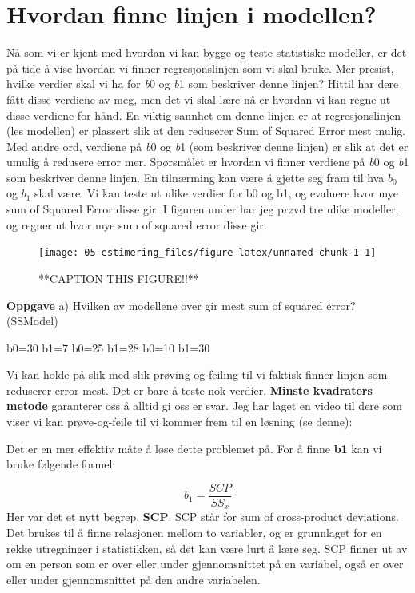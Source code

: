 \documentclass[
]{book}
\begin{document}
\hypertarget{hvordan-finne-linjen-i-modellen}{%
\chapter{Hvordan finne linjen i modellen?}\label{hvordan-finne-linjen-i-modellen}}

Nå som vi er kjent med hvordan vi kan bygge og teste statistiske modeller, er det på tide å vise hvordan vi finner regresjonslinjen som vi skal bruke. Mer presist, hvilke verdier skal vi ha for \emph{b}0 og \emph{b}1 som beskriver denne linjen? Hittil har dere fått disse verdiene av meg, men det vi skal lære nå er hvordan vi kan regne ut disse verdiene for hånd. En viktig sannhet om denne linjen er at regresjonslinjen (les modellen) er plassert slik at den reduserer Sum of Squared Error mest mulig. Med andre ord, verdiene på \emph{b}0 og \emph{b}1 (som beskriver denne linjen) er slik at det er umulig å redusere error mer. Spørsmålet er hvordan vi finner verdiene på \emph{b}0 og \emph{b}1 som beskriver denne linjen. En tilnærming kan være å gjette seg fram til hva \(b_0\) og \(b_1\) skal være. Vi kan teste ut ulike verdier for b0 og b1, og evaluere hvor mye sum of Squared Error disse gir. I figuren under har jeg prøvd tre ulike modeller, og regner ut hvor mye sum of squared error disse gir.

\begin{figure}

{\centering \texttt{[image: 05-estimering\_files/figure-latex/unnamed-chunk-1-1]} 

}

\caption{**CAPTION THIS FIGURE!!**}\label{fig:unnamed-chunk-1}
\end{figure}

\textbf{Oppgave}
a) Hvilken av modellene over gir mest sum of squared error? (SSModel)

b0=30 b1=7 b0=25 b1=28 b0=10 b1=30

Vi kan holde på slik med slik prøving-og-feiling til vi faktisk finner linjen som reduserer error mest. Det er bare å teste nok verdier. \textbf{Minste kvadraters metode} garanterer oss å alltid gi oss er svar. Jeg har laget en video til dere som viser vi kan prøve-og-feile til vi kommer frem til en løsning (se denne):

Det er en mer effektiv måte å løse dette problemet på. For å finne \textbf{b1} kan vi bruke følgende formel:

\[ b_1 = \frac{SCP}{SS_x} \]
Her var det et nytt begrep, \textbf{SCP}. SCP står for sum of cross-product deviations. Det brukes til å finne relasjonen mellom to variabler, og er grunnlaget for en rekke utregninger i statistikken, så det kan være lurt å lære seg. SCP finner ut av om en person som er over eller under gjennomsnittet på en variabel, også er over eller under gjennomsnittet på den andre variabelen.
\end{document}
